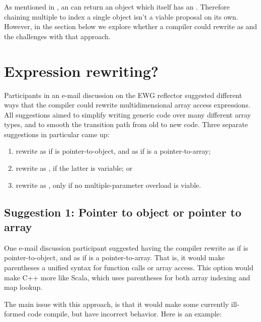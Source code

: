 \documentclass{wg21}
\begin{document}
As mentioned in , an  can return an object which itself has an .
Therefore chaining multiple \tcode{[]} to index a single object isn't a viable proposal on its own.
However, in the section below we explore whether a compiler could rewrite  as 
and the challenges with that approach.

\section{Expression rewriting?}

Participants in an e-mail discussion on the EWG reflector suggested different ways that the compiler could rewrite multidimensional array access expressions.  All suggestions aimed to simplify writing generic code over many different array types, and to smooth the transition path from old to new code.  Three separate suggestions in particular came up:

\begin{enumerate}
\item rewrite  as  if  is pointer-to-object, and  as  if  is a pointer-to-array;
\item rewrite  as , if the latter is variable; or
\item rewrite  as , only if no multiple-parameter  overload is viable.
\end{enumerate}

\subsection{Suggestion 1: Pointer to object or pointer to array}

One e-mail discussion participant suggested having the compiler rewrite  as  if  is pointer-to-object, and  as  if  is a pointer-to-array.  That is, it would make parentheses a unified syntax for function calls or array access.  This option would make C++ more like Scala, which uses parentheses for both array indexing and map lookup.

The main issue with this approach, is that it would make some currently ill-formed code compile, but have incorrect behavior.  Here is an example:
\end{document}
